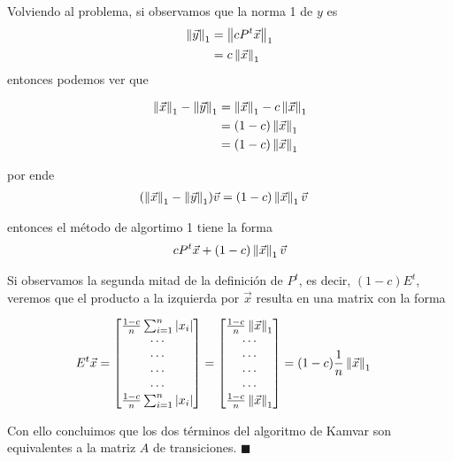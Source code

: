 Volviendo al problema, si observamos que la norma 1 de $y$  es
\begin{align*}
\left\|\vec{y}\right\|_1 &= \left\|cP^{t} \vec{x}\right\|_1 \\
               &= c\left\|\vec{x}\right\|_1
\end{align*}
entonces podemos ver que

\begin{align*}
\left\|\vec{x}\right\|_1 - \left\|\vec{y}\right\|_1 &= \left\|\vec{x}\right\|_1 - c \left\|\vec{x}\right\|_1 \\
                                        &= (1-c) \left\|\vec{x}\right\|_1 \\
                                        &= (1-c) \left\|\vec{x}\right\|_1
\end{align*}

por ende
\begin{align*}
(\left\|\vec{x}\right\|_1 - \left\|\vec{y}\right\|_1)\vec{v} &= (1-c) \left\|\vec{x}\right\|_1 \vec{v}
\end{align*}

entonces el método de algortimo 1 tiene la forma
\begin{align*}
cP^{t}\vec{x} + (1-c) \left\|\vec{x}\right\|_1 \vec{v}
\end{align*}

Si observamos la segunda mitad de la definición de $P^{t}$, es decir, $(1-c)E^{t}$, veremos que el producto
a la izquierda por $\vec{x}$ resulta en una matrix con la forma

\begin{align*}
E^{t}\vec{x} &= 
\begin{bmatrix}
\frac{1-c}{n} \sum_{i=1}^{n} |x_{i}|  \\
\cdots  \\
\cdots  \\
\cdots  \\
\cdots  \\
\frac{1-c}{n} \sum_{i=1}^{n} |x_{i}|  \\
\end{bmatrix}
=
\begin{bmatrix}
\frac{1-c}{n} \left\|\vec{x}\right\|_1 \\
\cdots  \\
\cdots  \\
\cdots  \\
\cdots  \\
\frac{1-c}{n} \left\|\vec{x}\right\|_1 \\
\end{bmatrix}
=
(1-c)\frac{1}{n} \left\|\vec{x}\right\|_1
\end{align*}

Con ello concluimos que los dos términos del algoritmo de Kamvar son equivalentes
a la matriz $A$ de transiciones. $ \blacksquare $


